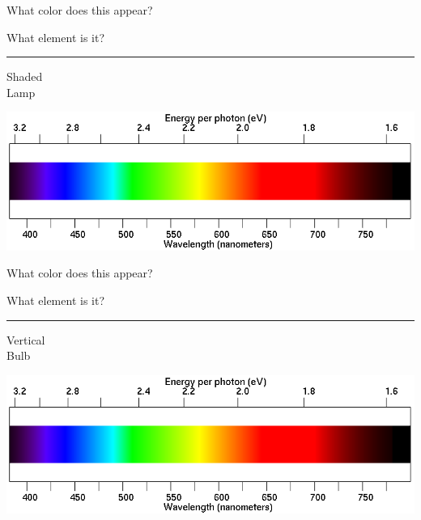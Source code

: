 \documentclass[12pt]{article}
\begin{document}
\begin{minipage}{0.5\textwidth}
What color does this appear?
\end{minipage}
\begin{minipage}{0.5\textwidth}
What element is it?
\end{minipage}


\vspace{1in}
\hrule

\begin{minipage}{0.1\textwidth}
\begin{center}
Shaded\\Lamp
\end{center}
\end{minipage}
\begin{minipage}{0.8\textwidth}
\includegraphics[width=\textwidth]{spectrum2.png}
\end{minipage}

\begin{minipage}{0.5\textwidth}
What color does this appear?
\end{minipage}
\begin{minipage}{0.5\textwidth}
What element is it?
\end{minipage}

\vspace{1in}
\hrule

\begin{minipage}{0.1\textwidth}
\begin{center}
Vertical \\ Bulb
\end{center}
\end{minipage}
\begin{minipage}{0.8\textwidth}
\includegraphics[width=\textwidth]{spectrum2.png}
\end{minipage}
\end{document}
